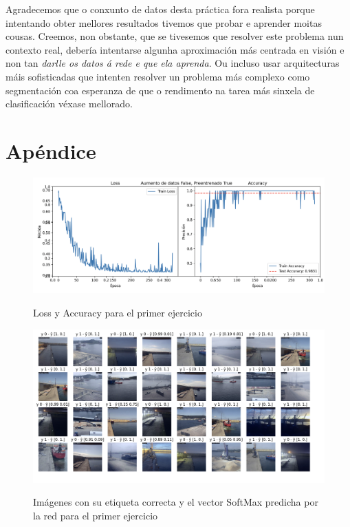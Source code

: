 \documentclass{article}
\begin{document}
Agradecemos que o conxunto de datos desta práctica fora realista porque intentando obter mellores resultados tivemos que probar e aprender moitas cousas. Creemos, non obstante, que se tivesemos que resolver este problema nun contexto real, debería intentarse algunha aproximación más centrada en visión e non tan \emph{darlle os datos á rede e que ela aprenda}. Ou incluso usar arquitecturas máis sofisticadas que intenten resolver un problema más complexo como segmentación coa esperanza de que o rendimento na tarea más sinxela de clasificación véxase mellorado.

\section{Apéndice}

\begin{figure}[h]
	\centering
	\includegraphics[width=0.9\linewidth]{lossEj1}
	\label{fig:lossEj1}
	\caption{Loss y Accuracy para el primer ejercicio}
\end{figure}

\begin{figure}[h]
	\centering
	\includegraphics[width=0.8\linewidth]{imagenesEj1}
	\label{fig:imagenesEj1}
	\caption{Imágenes con su etiqueta correcta y el vector SoftMax predicha por la red para el primer ejercicio}
\end{figure}

\end{document}
